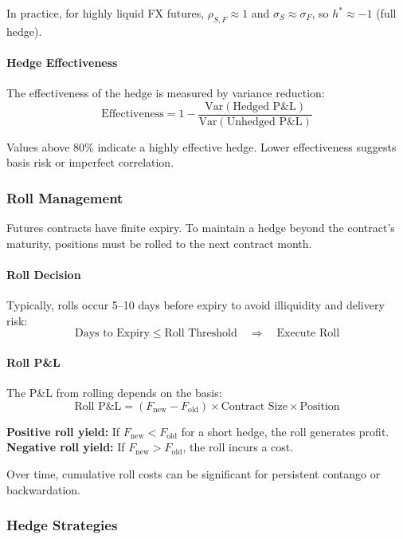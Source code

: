 In practice, for highly liquid FX futures, $\rho_{S,F} \approx 1$ and $\sigma_S \approx \sigma_F$, so $h^* \approx -1$ (full hedge).

\paragraph{Hedge Effectiveness}

The effectiveness of the hedge is measured by variance reduction:
\[
\text{Effectiveness} = 1 - \frac{\text{Var}(\text{Hedged P\&L})}{\text{Var}(\text{Unhedged P\&L})}
\]

Values above 80\% indicate a highly effective hedge. Lower effectiveness suggests basis risk or imperfect correlation.

\subsubsection{Roll Management}

Futures contracts have finite expiry. To maintain a hedge beyond the contract's maturity, positions must be rolled to the next contract month.

\paragraph{Roll Decision}

Typically, rolls occur 5--10 days before expiry to avoid illiquidity and delivery risk:
\[
\text{Days to Expiry} \leq \text{Roll Threshold} \quad \Rightarrow \quad \text{Execute Roll}
\]

\paragraph{Roll P\&L}

The P\&L from rolling depends on the basis:
\[
\text{Roll P\&L} = (F_{\text{new}} - F_{\text{old}}) \times \text{Contract Size} \times \text{Position}
\]

\textbf{Positive roll yield:} If $F_{\text{new}} < F_{\text{old}}$ for a short hedge, the roll generates profit.
\textbf{Negative roll yield:} If $F_{\text{new}} > F_{\text{old}}$, the roll incurs a cost.

Over time, cumulative roll costs can be significant for persistent contango or backwardation.

\subsubsection{Hedge Strategies}

